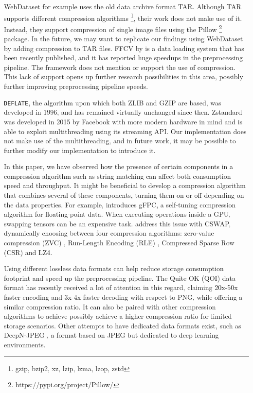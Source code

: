 \documentclass[sigconf,nonacm]{acmart}
\begin{document}
WebDataset \cite{aizman2020highperformance} for example uses the old data archive format TAR.
Although TAR supports different compression algorithms \footnote{gzip, bzip2, xz, lzip, lzma, lzop, zstd}, their work does not make use of it.
Instead, they support compression of single image files using the Pillow \footnote{https://pypi.org/project/Pillow/} package.
In the future, we may want to replicate our findings using WebDataset by adding compression to TAR files.
FFCV by \citet{leclerc2022ffcv} is a data loading system that has been recently published, and it has reported huge speedups in the preprocessing pipeline.
The framework does not mention or support the use of compression.
This lack of support opens up further research possibilities in this area, possibly further improving preprocessing pipeline speeds.

\texttt{DEFLATE}, the algorithm upon which both ZLIB and GZIP are based, was developed in 1996, and has remained virtually unchanged since then.
Zstandard was developed in 2015 by Facebook with more modern hardware in mind and is able to exploit multithreading using its streaming API.
Our implementation does not make use of the multithreading, and in future work, it may be possible to further modify our implementation to introduce it.

In this paper, we have observed how the presence of certain components in a compression algorithm such as string matching can affect both consumption speed and throughput.
It might be beneficial to develop a compression algorithm that combines several of these components, turning them on or off depending on the data properties.
For example, \citet{burtscher2010gfpc} introduces gFPC, a self-tuning compression algorithm for floating-point data.
When executing operations inside a GPU, swapping tensors can be an expensive task.
\citet{chen2021cswap} address this issue with CSWAP, dynamically choosing between four compression algorithms: zero-value compression (ZVC) \cite{rhu2018compressing}, Run-Length Encoding (RLE) \cite{robinson1967results}, Compressed Sparse Row (CSR) \cite{alabaichi2017anovel} and LZ4.

Using different lossless data formats can help reduce storage consumption footprint and speed up the preprocessing pipeline.
The Quite OK (QOI) \cite{qoi2021dominic} data format has recently received a lot of attention in this regard, claiming 20x-50x faster encoding and 3x-4x faster decoding with respect to PNG, while offering a similar compression ratio.
It can also be paired with other compression algorithms to achieve possibly achieve a higher compression ratio for limited storage scenarios.
Other attempts to have dedicated data formats exist, such as DeepN-JPEG \citet{liu2018deepn-jpeg}, a format based on JPEG but dedicated to deep learning environments.
\end{document}
